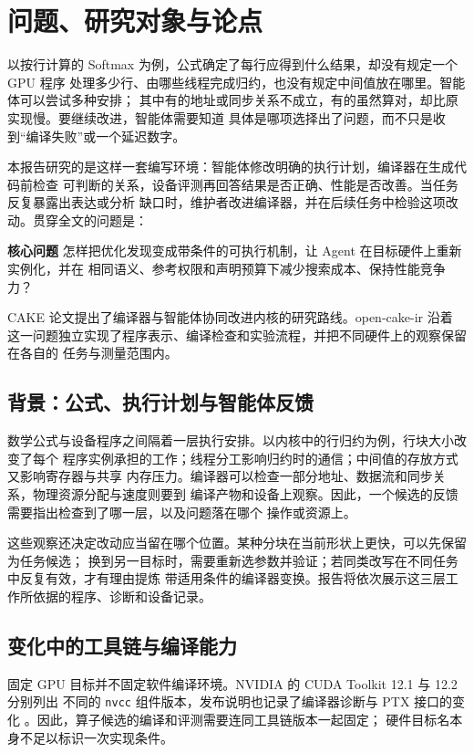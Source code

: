 \documentclass[UTF8,11pt,a4paper,fontset=none]{ctexart}
\newcommand{\code}[1]{\texttt{#1}}
\begin{document}
\section{问题、研究对象与论点}

以按行计算的 Softmax 为例，公式确定了每行应得到什么结果，却没有规定一个 GPU 程序
处理多少行、由哪些线程完成归约，也没有规定中间值放在哪里。智能体可以尝试多种安排；
其中有的地址或同步关系不成立，有的虽然算对，却比原实现慢。要继续改进，智能体需要知道
具体是哪项选择出了问题，而不只是收到“编译失败”或一个延迟数字。

本报告研究的是这样一套编写环境：智能体修改明确的执行计划，编译器在生成代码前检查
可判断的关系，设备评测再回答结果是否正确、性能是否改善。当任务反复暴露出表达或分析
缺口时，维护者改进编译器，并在后续任务中检验这项改动。贯穿全文的问题是：
\begin{notebox}
\noindent\textbf{核心问题}\quad
怎样把优化发现变成带条件的可执行机制，让 Agent 在目标硬件上重新实例化，并在
相同语义、参考权限和声明预算下减少搜索成本、保持性能竞争力？
\end{notebox}
CAKE 论文提出了编译器与智能体协同改进内核的研究路线\cite{cake}。open-cake-ir 沿着
这一问题独立实现了程序表示、编译检查和实验流程，并把不同硬件上的观察保留在各自的
任务与测量范围内\cite{papercontract}。

\subsection{背景：公式、执行计划与智能体反馈}
数学公式与设备程序之间隔着一层执行安排。以内核中的行归约为例，行块大小改变了每个
程序实例承担的工作；线程分工影响归约时的通信；中间值的存放方式又影响寄存器与共享
内存压力。编译器可以检查一部分地址、数据流和同步关系，物理资源分配与速度则要到
编译产物和设备上观察。因此，一个候选的反馈需要指出检查到了哪一层，以及问题落在哪个
操作或资源上。

这些观察还决定改动应当留在哪个位置。某种分块在当前形状上更快，可以先保留为任务候选；
换到另一目标时，需要重新选参数并验证；若同类改写在不同任务中反复有效，才有理由提炼
带适用条件的编译器变换。报告将依次展示这三层工作所依据的程序、诊断和设备记录。

\subsection{变化中的工具链与编译能力}
固定 GPU 目标并不固定软件编译环境。NVIDIA 的 CUDA Toolkit 12.1 与 12.2 分别列出
不同的 \code{nvcc} 组件版本，发布说明也记录了编译器诊断与 PTX 接口的变化
\cite{cuda121,cuda122}。因此，算子候选的编译和评测需要连同工具链版本一起固定；
硬件目标名本身不足以标识一次实现条件。
\end{document}
